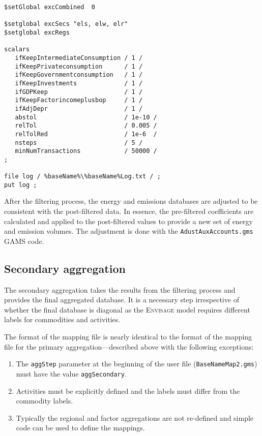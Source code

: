 \begin{lstlisting}[language=GAMS, caption={User option file for the filter program}, label=lst:Filter]
$setGlobal excCombined  0

$setglobal excSecs "els, elw, elr"
$setglobal excRegs

scalars
   ifKeepIntermediateConsumption / 1 /
   ifKeepPrivateconsumption      / 1 /
   ifKeepGovernmentconsumption   / 1 /
   ifKeepInvestments             / 1 /
   ifGDPKeep                     / 1 /
   ifKeepFactorincomeplusbop     / 1 /
   ifAdjDepr                     / 1 /
   abstol                        / 1e-10 /
   relTol                        / 0.005 /
   relTolRed                     / 1e-6  /
   nsteps                        / 5 /
   minNumTransactions            / 50000 /
;

file log / %baseName%\%baseName%Log.txt / ;
put log ;
\end{lstlisting}

After the filtering process, the energy and emissions databases are
adjusted to be consistent with the post-filtered data. In essence,
the pre-filtered coefficients are calculated and applied to
the post-filtered values to provide a new set of energy and
emission volumes. The adjustment is done with the
\texttt{AdustAuxAccounts.gms} GAMS code.

\subsection{Secondary aggregation}

The secondary aggregation takes the results from the
filtering process and provides the final aggregated database.
It is a necessary step irrespective of whether the
final database is diagonal as the \textsc{Envisage}
model requires different labels for commodities and activities.

The format of the mapping file is nearly identical to the format
of the mapping file for the primary aggregation---described above with
the following exceptions:

\begin{enumerate}
\item The \texttt{aggStep} parameter at the beginning of the
user file (\texttt{BaseNameMap2.gms}) must have the value
\texttt{aggSecondary}.
\item Activities must be explicitly defined and the labels
must differ from the commodity labels.
\item Typically the regional and factor aggregations are
not re-defined and simple code can be used to define the mappings.
\end{enumerate}

